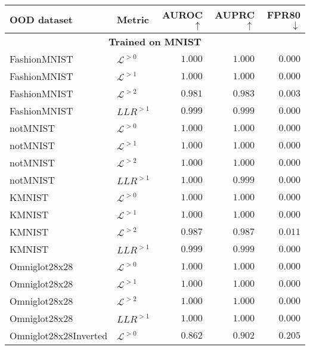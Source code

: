 {\begin{table}[t]
    \centering
    \begin{tabular}{llrrr}
        \toprule
         OOD dataset & Metric & AUROC$\uparrow$ & AUPRC$\uparrow$ & FPR80$\downarrow$ \\
         \midrule
         \multicolumn{5}{c}{\textbf{Trained on MNIST}} \\
         \midrule
FashionMNIST                     &  $\mathcal{L}^{>0}$  &  $1.000$  &  $1.000$  &  $0.000$ \\
FashionMNIST                     &  $\mathcal{L}^{>1}$  &  $1.000$  &  $1.000$  &  $0.000$ \\
FashionMNIST                     &  $\mathcal{L}^{>2}$  &  $0.981$  &  $0.983$  &  $0.003$ \\
FashionMNIST                   &  $LLR^{>1}$  &  $0.999$  &  $0.999$  &  $0.000$ \\
\midrule
notMNIST                         &  $\mathcal{L}^{>0}$  &  $1.000$  &  $1.000$  &  $0.000$ \\
notMNIST                         &  $\mathcal{L}^{>1}$  &  $1.000$  &  $1.000$  &  $0.000$ \\
notMNIST                         &  $\mathcal{L}^{>2}$  &  $1.000$  &  $1.000$  &  $0.000$ \\
notMNIST                       &  $LLR^{>1}$  &  $1.000$  &  $0.999$  &  $0.000$ \\
\midrule
KMNIST                           &  $\mathcal{L}^{>0}$  &  $1.000$  &  $1.000$  &  $0.000$ \\
KMNIST                           &  $\mathcal{L}^{>1}$  &  $1.000$  &  $1.000$  &  $0.000$ \\
KMNIST                           &  $\mathcal{L}^{>2}$  &  $0.987$  &  $0.987$  &  $0.011$ \\
KMNIST                         &  $LLR^{>1}$  &  $0.999$  &  $0.999$  &  $0.000$ \\
\midrule
Omniglot28x28                    &  $\mathcal{L}^{>0}$  &  $1.000$  &  $1.000$  &  $0.000$ \\
Omniglot28x28                    &  $\mathcal{L}^{>1}$  &  $1.000$  &  $1.000$  &  $0.000$ \\
Omniglot28x28                    &  $\mathcal{L}^{>2}$  &  $1.000$  &  $1.000$  &  $0.000$ \\
Omniglot28x28                  &  $LLR^{>1}$  &  $1.000$  &  $1.000$  &  $0.000$ \\
\midrule
Omniglot28x28Inverted            &  $\mathcal{L}^{>0}$  &  $0.862$  &  $0.902$  &  $0.205$ \\

\end{tabular}
\end{table}}
